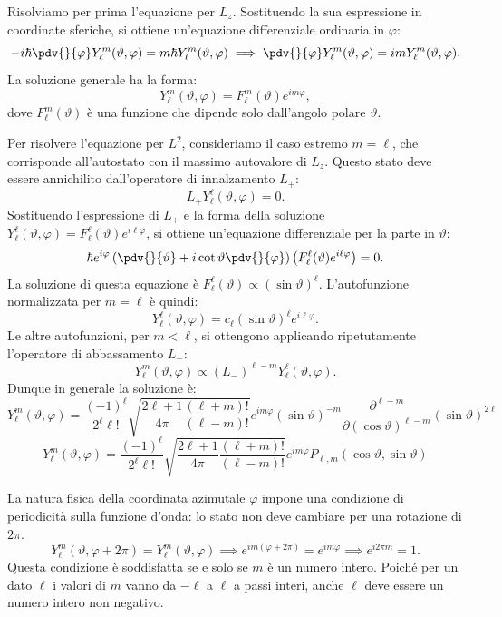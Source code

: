 Risolviamo per prima l'equazione per \(L_z\). Sostituendo la sua espressione in coordinate sferiche, si ottiene un'equazione differenziale ordinaria in \(\varphi\):
\[
    -i\hbar \pdv{}{\varphi} Y_\ell^m(\vartheta, \varphi) = m\hbar Y_\ell^m(\vartheta, \varphi)
    \implies \pdv{}{\varphi} Y_\ell^m(\vartheta, \varphi) = i m Y_\ell^m(\vartheta, \varphi).
\]
La soluzione generale ha la forma:
\begin{equation}
    Y_\ell^m(\vartheta, \varphi) = F_\ell^m(\vartheta) e^{i m \varphi},
\end{equation}
dove \(F_\ell^m(\vartheta)\) è una funzione che dipende solo dall'angolo polare \(\vartheta\).

Per risolvere l'equazione per \(L^2\), consideriamo il caso estremo \(m=\ell\), che corrisponde all'autostato con il massimo autovalore di \(L_z\). Questo stato deve essere annichilito dall'operatore di innalzamento \(L_+\):
\[
    L_+ Y_{\ell}^{\ell}(\vartheta, \varphi) = 0.
\]
Sostituendo l'espressione di \(L_+\) e la forma della soluzione \(Y_\ell^\ell(\vartheta, \varphi) = F_\ell^\ell(\vartheta) e^{i\ell\varphi}\), si ottiene un'equazione differenziale per la parte in \(\vartheta\):
\[
    \hbar e^{i\varphi} \left( \pdv{}{\vartheta} + i\cot\vartheta \pdv{}{\varphi} \right) \left( F_{\ell}^{\ell}(\vartheta) e^{i\ell\varphi} \right) = 0.
\]
La soluzione di questa equazione è \(F_\ell^\ell(\vartheta) \propto (\sin\vartheta)^\ell\). L'autofunzione normalizzata per \(m=\ell\) è quindi:
\[
    Y_{\ell}^{\ell}(\vartheta, \varphi) = c_{\ell} (\sin\vartheta)^{\ell} e^{i\ell\varphi}.
\]
Le altre autofunzioni, per \(m < \ell\), si ottengono applicando ripetutamente l'operatore di abbassamento \(L_-\):
\[
    Y_{\ell}^m(\vartheta, \varphi) \propto (L_-)^{\ell-m} Y_{\ell}^{\ell}(\vartheta, \varphi).
\]
Dunque in generale la soluzione è:
\begin{equation}
    Y_{\ell}^m(\vartheta, \varphi) = \frac{(-1)^{\ell}}{2^{\ell}\ell!} \sqrt{\frac{2\ell + 1}{4\pi} \frac{(\ell + m)!}{(\ell - m)!}} e^{im\varphi} (\sin\vartheta)^{-m} \frac{\partial^{\ell-m}}{\partial(\cos\vartheta)^{\ell-m}} (\sin\vartheta)^{2\ell}
\end{equation}
\begin{equation}
    Y_{\ell}^m(\vartheta, \varphi) = \frac{(-1)^{\ell}}{2^{\ell}\ell!} \sqrt{\frac{2\ell + 1}{4\pi} \frac{(\ell + m)!}{(\ell - m)!}} e^{im\varphi} P_{\ell,m}(\cos\vartheta, \sin\vartheta)
\end{equation}

La natura fisica della coordinata azimutale \(\varphi\) impone una condizione di periodicità sulla funzione d'onda: lo stato non deve cambiare per una rotazione di \(2\pi\).
\[
    Y_{\ell}^m(\vartheta, \varphi + 2\pi) = Y_{\ell}^m(\vartheta, \varphi)
    \implies e^{im(\varphi+2\pi)} = e^{im\varphi}
    \implies e^{i2\pi m} = 1.
\]
Questa condizione è soddisfatta se e solo se \(m\) è un numero intero. Poiché per un dato \(\ell\) i valori di \(m\) vanno da \(-\ell\) a \(\ell\) a passi interi, anche \(\ell\) deve essere un numero intero non negativo.

